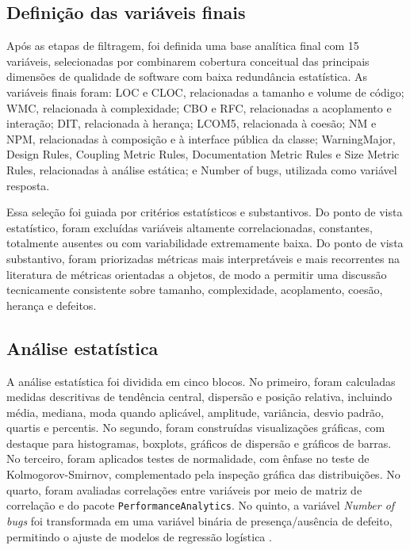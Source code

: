 \documentclass[12pt]{article}
\begin{document}
\subsection{Definição das variáveis finais}

Após as etapas de filtragem, foi definida uma base analítica final com 15 variáveis, selecionadas por combinarem cobertura conceitual das principais dimensões de qualidade de software com baixa redundância estatística. As variáveis finais foram: LOC e CLOC, relacionadas a tamanho e volume de código; WMC, relacionada à complexidade; CBO e RFC, relacionadas a acoplamento e interação; DIT, relacionada à herança; LCOM5, relacionada à coesão; NM e NPM, relacionadas à composição e à interface pública da classe; WarningMajor, Design Rules, Coupling Metric Rules, Documentation Metric Rules e Size Metric Rules, relacionadas à análise estática; e Number of bugs, utilizada como variável resposta.

Essa seleção foi guiada por critérios estatísticos e substantivos. Do ponto de vista estatístico, foram excluídas variáveis altamente correlacionadas, constantes, totalmente ausentes ou com variabilidade extremamente baixa. Do ponto de vista substantivo, foram priorizadas métricas mais interpretáveis e mais recorrentes na literatura de métricas orientadas a objetos, de modo a permitir uma discussão tecnicamente consistente sobre tamanho, complexidade, acoplamento, coesão, herança e defeitos.


\subsection{Análise estatística}

A análise estatística foi dividida em cinco blocos. No primeiro, foram calculadas medidas descritivas de tendência central, dispersão e posição relativa, incluindo média, mediana, moda quando aplicável, amplitude, variância, desvio padrão, quartis e percentis. No segundo, foram construídas visualizações gráficas, com destaque para histogramas, boxplots, gráficos de dispersão e gráficos de barras. No terceiro, foram aplicados testes de normalidade, com ênfase no teste de Kolmogorov-Smirnov, complementado pela inspeção gráfica das distribuições. No quarto, foram avaliadas correlações entre variáveis por meio de matriz de correlação e do pacote \texttt{PerformanceAnalytics}. No quinto, a variável \textit{Number of bugs} foi transformada em uma variável binária de presença/ausência de defeito, permitindo o ajuste de modelos de regressão logística \cite{hosmer2013}.
\end{document}
